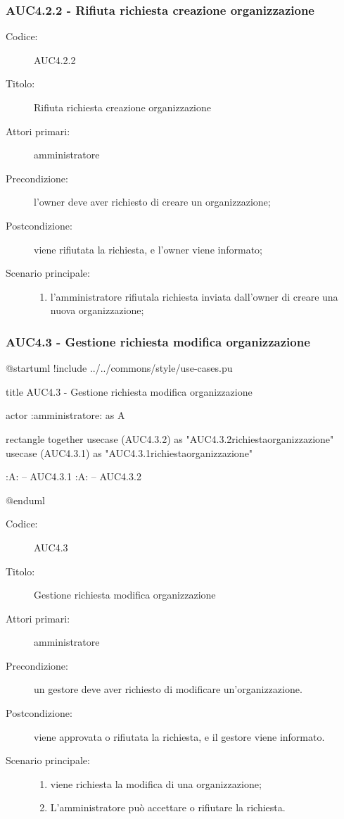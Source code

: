 \documentclass[casi-duso]{subfiles}
\begin{document}
\subsubsection{AUC4.2.2 - Rifiuta richiesta creazione organizzazione}%
\label{subsub:AUC4.2.2}
\begin{description}
  \item[Codice:] AUC4.2.2
  \item[Titolo:] Rifiuta richiesta creazione organizzazione
  \item[Attori primari:] amministratore
  \item[Precondizione:] l'owner deve aver richiesto di creare un organizzazione;
  \item[Postcondizione:] viene rifiutata la richiesta, e l'owner viene informato;
  \item[Scenario principale:]
  \begin{enumerate}
    \item  l'amministratore rifiutala richiesta inviata dall'owner di creare una nuova organizzazione;
  \end{enumerate}
\end{description}

\subsubsection{AUC4.3 - Gestione richiesta modifica organizzazione}%
\label{subsub:AUC4.3}

\begin{plantuml}
@startuml
!include ../../commons/style/use-cases.pu

title AUC4.3 - Gestione richiesta modifica organizzazione

actor :amministratore: as A

rectangle {
  together {
    usecase (AUC4.3.2) as "AUC4.3.2\nRifiuta richiesta\nmodifica organizzazione"
    usecase (AUC4.3.1) as "AUC4.3.1\nAccetta richiesta\nmodifica organizzazione"
  }
}

:A: -- AUC4.3.1
:A: -- AUC4.3.2

@enduml
\end{plantuml}

\begin{description}
  \item[Codice:] AUC4.3
  \item[Titolo:] Gestione richiesta modifica organizzazione
  \item[Attori primari:] amministratore
  \item[Precondizione:] un gestore deve aver richiesto di modificare un'organizzazione.
  \item[Postcondizione:] viene approvata o rifiutata la richiesta, e il gestore viene informato.
  \item[Scenario principale:]
  \begin{enumerate}
    \item viene richiesta la modifica di una organizzazione;
    \item L'amministratore può accettare o rifiutare la richiesta.
  \end{enumerate}
\end{description}
\end{document}
